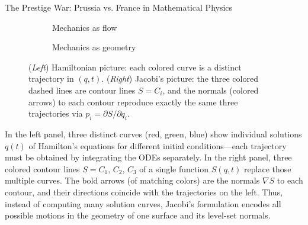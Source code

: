 \begin{HistoricalSidebar}{The Prestige War: Prussia vs. France in Mathematical Physics}
\begin{figure}[H]
  \centering
  \begin{subfigure}[b]{0.45\textwidth}
    \centering
    \caption{Mechanics as flow}
  \end{subfigure}
  \quad
  \begin{subfigure}[b]{0.45\textwidth}
    \centering
    \caption{Mechanics as geometry}
  \end{subfigure}
  \caption{%
  (\emph{Left}) Hamiltonian picture: each colored curve is a distinct trajectory in \((q,t)\).  
  (\emph{Right}) Jacobi’s picture: the three colored dashed lines are contour lines \(S=C_i\), and the normals (colored arrows) to each contour reproduce exactly the same three trajectories via 
  \(\displaystyle p_i=\partial S/\partial q_i\).}
\end{figure}


In the left panel, three distinct curves (red, green, blue) show individual solutions \(q(t)\) of Hamilton’s equations 
for different initial conditions—each trajectory must be obtained by integrating the ODEs separately.  In the right 
panel, three colored contour lines \(S=C_1,\,C_2,\,C_3\) of a single function \(S(q,t)\) replace those multiple curves.  
The bold arrows (of matching colors) are the normals \(\nabla S\) to each contour, and their directions coincide 
with the trajectories on the left.  Thus, instead of computing many solution curves, Jacobi’s formulation encodes 
all possible motions in the geometry of one surface and its level-set normals.





\end{HistoricalSidebar}
